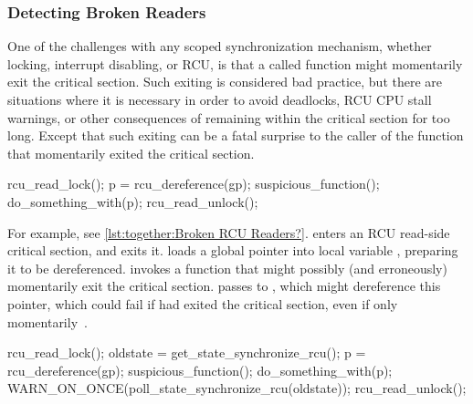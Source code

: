 \subsubsection{Detecting Broken Readers}
\label{sec:together:Detecting Broken Readers}

One of the challenges with any scoped synchronization mechanism, whether
locking, interrupt disabling, or RCU, is that a called function might
momentarily exit the critical section.
Such exiting is considered bad practice, but there are situations where
it is necessary in order to avoid deadlocks, RCU CPU stall warnings, or
other consequences of remaining within the critical section for too long.
Except that such exiting can be a fatal surprise to the caller of the
function that momentarily exited the critical section.

\begin{listing}[tbp] 
{ \scriptsize
\begin{fcvlabel}
\begin{VerbatimL}[commandchars=\\\[\]]
rcu_read_lock();					\lnlbl[rrl]
p = rcu_dereference(gp);				\lnlbl[rd]
suspicious_function();					\lnlbl[sf]
do_something_with(p);					\lnlbl[dsw]
rcu_read_unlock();					\lnlbl[rrul]
\end{VerbatimL}
\end{fcvlabel}
}
\caption{Broken RCU Readers?}
\label{lst:together:Broken RCU Readers?}
\end{listing}

\begin{fcvref}
For example, see
\cref{lst:together:Broken RCU Readers?}.
 enters an RCU read-side critical section, and 
exits it.
 loads a global pointer  into local variable ,
preparing it to be dereferenced.
 invokes a function that might possibly (and erroneously)
momentarily exit the critical section.
 passes  to , which might
dereference this pointer, which could fail if 
had exited the critical section, even if only
momentarily~\cite{LorenzoStoakes2025ReaderLeak,VlastimilBabka2025PollReaderLeak}.

\end{fcvref}

\begin{listing}[tbp] 
{ \scriptsize
\begin{fcvlabel}
\begin{VerbatimL}[commandchars=\\\[\]]
rcu_read_lock();					\lnlbl[rrl]
oldstate = get_state_synchronize_rcu();			\lnlbl[gssr]
p = rcu_dereference(gp);				\lnlbl[rd]
suspicious_function();					\lnlbl[sf]
do_something_with(p);					\lnlbl[dsw]
WARN_ON_ONCE(poll_state_synchronize_rcu(oldstate));	\lnlbl[pssr]
rcu_read_unlock();					\lnlbl[rrul]
\end{VerbatimL}
\end{fcvlabel}
}
\caption{Polling For Broken RCU Readers}
\label{lst:together:Polling For Broken RCU Readers}
\end{listing}

